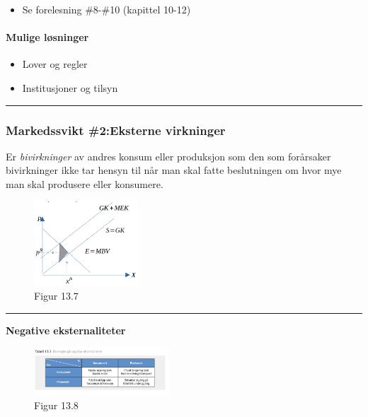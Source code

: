 \documentclass[
  letterpaper,
  DIV=11,
  numbers=noendperiod]{scrartcl}
\let\oldparagraph\paragraph
\renewcommand{\paragraph}[1]{\oldparagraph{#1}\mbox{}}
\providecommand{\tightlist}{%
  \setlength{\itemsep}{0pt}\setlength{\parskip}{0pt}}\usepackage{longtable,booktabs,array}
\begin{document}
\begin{itemize}
\tightlist
\item
  Se forelesning \#8-\#10 (kapittel 10-12)
\end{itemize}

\paragraph{Mulige løsninger}\label{mulige-luxf8sninger}

\begin{itemize}
\tightlist
\item
  Lover og regler
\item
  Institusjoner og tilsyn
\end{itemize}

\begin{center}\rule{0.5\linewidth}{0.5pt}\end{center}

\subsubsection{Markedssvikt \#2:Eksterne
virkninger}\label{markedssvikt-2eksterne-virkninger}

Er \emph{bivirkninger} av andres konsum eller produksjon som den som
forårsaker bivirkninger ikke tar hensyn til når man skal fatte
beslutningen om hvor mye man skal produsere eller konsumere.

\begin{figure}[H]

{\centering \includegraphics[width=0.35\textwidth,height=\textheight]{drawio/eks_mrk.png}

}

\caption{Figur 13.7}

\end{figure}%

\begin{center}\rule{0.5\linewidth}{0.5pt}\end{center}

\textbf{Negative eksternaliteter}

\begin{figure}[H]

{\centering \includegraphics[width=0.45\textwidth,height=\textheight]{drawio/eks_neg.png}

}

\caption{Figur 13.8}

\end{figure}%
\end{document}
